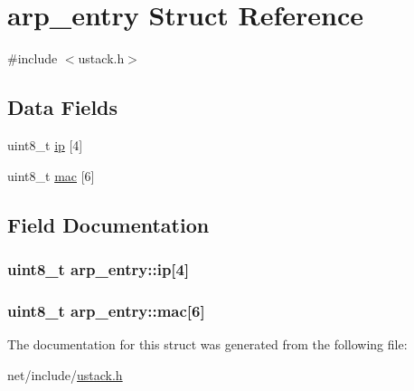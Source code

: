 \hypertarget{structarp__entry}{\section{arp\-\_\-entry Struct Reference}
\label{structarp__entry}
}


{\ttfamily \#include $<$ustack.\-h$>$}

\subsection*{Data Fields}
\begin{DoxyCompactItemize}
\item 
uint8\-\_\-t \hyperlink{structarp__entry_a66483dc0b1c1ef9215b1e85185044d54}{ip} \mbox{[}4\mbox{]}
\item 
uint8\-\_\-t \hyperlink{structarp__entry_af9a7c3845ffe5ef927c4d94b65d9cb7e}{mac} \mbox{[}6\mbox{]}
\end{DoxyCompactItemize}


\subsection{Field Documentation}
\hypertarget{structarp__entry_a66483dc0b1c1ef9215b1e85185044d54}{
\subsubsection[{ip}]{\setlength{\rightskip}{0pt plus 5cm}uint8\-\_\-t arp\-\_\-entry\-::ip\mbox{[}4\mbox{]}}}\label{structarp__entry_a66483dc0b1c1ef9215b1e85185044d54}
\hypertarget{structarp__entry_af9a7c3845ffe5ef927c4d94b65d9cb7e}{
\subsubsection[{mac}]{\setlength{\rightskip}{0pt plus 5cm}uint8\-\_\-t arp\-\_\-entry\-::mac\mbox{[}6\mbox{]}}}\label{structarp__entry_af9a7c3845ffe5ef927c4d94b65d9cb7e}


The documentation for this struct was generated from the following file\-:\begin{DoxyCompactItemize}
\item 
net/include/\hyperlink{ustack_8h}{ustack.\-h}\end{DoxyCompactItemize}
